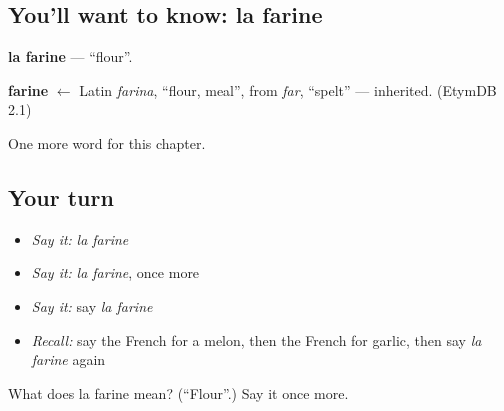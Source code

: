 \subsection*{You'll want to know: la farine}
\textbf{la farine} — \textquotedblleft{}flour\textquotedblright{}.

\begin{cousinweb}
\textbf{farine} $\leftarrow$ Latin \emph{farina}, \textquotedblleft{}flour, meal\textquotedblright{}, from \emph{far}, \textquotedblleft{}spelt\textquotedblright{} — inherited. (EtymDB 2.1)
\end{cousinweb}

\begin{grammarlens}[title={What you've built}]
One more word for this chapter.
\end{grammarlens}

\subsection*{Your turn}
\begin{itemize}
\raggedright
  \item \emph{Say it:} \emph{la farine}
  \item \emph{Say it:} \emph{la farine}, once more
  \item \emph{Say it:} say \emph{la farine}
  \item \emph{Recall:} say the French for a melon, then the French for garlic, then say \emph{la farine} again
\end{itemize}

\begin{tcolorbox}[breakable,colback=teal!4,colframe=teal!35!black,title={Before you move on}]
What does la farine mean? (\textquotedblleft{}Flour\textquotedblright{}.) Say it once more.
\end{tcolorbox}
